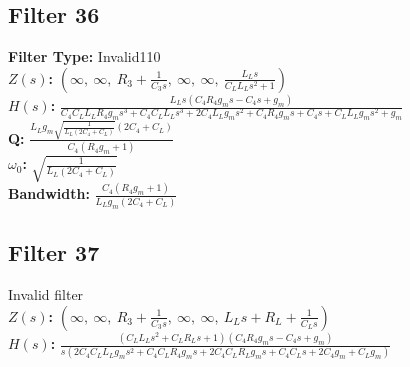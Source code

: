 \documentclass{article}
\begin{document}
\subsection*{Filter 36}
\textbf{Filter Type:} Invalid110 \\ 
\textbf{$Z(s)$:} $\left( \infty, \  \infty, \  R_{3} + \frac{1}{C_{3} s}, \  \infty, \  \infty, \  \frac{L_{L} s}{C_{L} L_{L} s^{2} + 1}\right)$ \\ 
\textbf{$H(s)$:} $\frac{L_{L} s \left(C_{4} R_{4} g_{m} s - C_{4} s + g_{m}\right)}{C_{4} C_{L} L_{L} R_{4} g_{m} s^{3} + C_{4} C_{L} L_{L} s^{3} + 2 C_{4} L_{L} g_{m} s^{2} + C_{4} R_{4} g_{m} s + C_{4} s + C_{L} L_{L} g_{m} s^{2} + g_{m}}$ \\ 
\textbf{Q:} $\frac{L_{L} g_{m} \sqrt{\frac{1}{L_{L} \left(2 C_{4} + C_{L}\right)}} \left(2 C_{4} + C_{L}\right)}{C_{4} \left(R_{4} g_{m} + 1\right)}$ \\ 
\textbf{$\omega_0$:} $\sqrt{\frac{1}{L_{L} \left(2 C_{4} + C_{L}\right)}}$ \\ 
\textbf{Bandwidth:} $\frac{C_{4} \left(R_{4} g_{m} + 1\right)}{L_{L} g_{m} \left(2 C_{4} + C_{L}\right)}$ \\ 
\subsection*{Filter 37}
Invalid filter \\ 
\textbf{$Z(s)$:} $\left( \infty, \  \infty, \  R_{3} + \frac{1}{C_{3} s}, \  \infty, \  \infty, \  L_{L} s + R_{L} + \frac{1}{C_{L} s}\right)$ \\ 
\textbf{$H(s)$:} $\frac{\left(C_{L} L_{L} s^{2} + C_{L} R_{L} s + 1\right) \left(C_{4} R_{4} g_{m} s - C_{4} s + g_{m}\right)}{s \left(2 C_{4} C_{L} L_{L} g_{m} s^{2} + C_{4} C_{L} R_{4} g_{m} s + 2 C_{4} C_{L} R_{L} g_{m} s + C_{4} C_{L} s + 2 C_{4} g_{m} + C_{L} g_{m}\right)}$ \\ 
\end{document}
